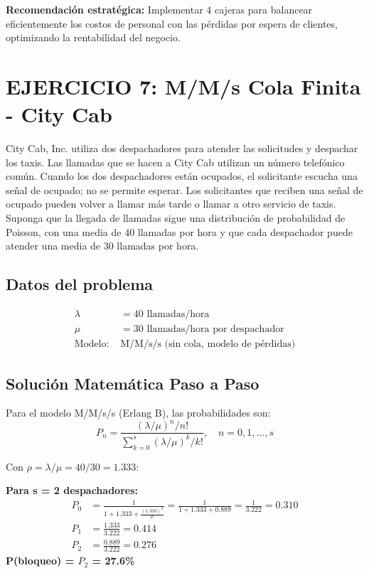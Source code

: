 \documentclass[12pt, a4paper, oneside]{book}
\theoremstyle{definition}
\begin{document}
\begin{center}
\begin{center}
\textbf{Recomendación estratégica:} Implementar 4 cajeras para balancear eficientemente los costos de personal con las pérdidas por espera de clientes, optimizando la rentabilidad del negocio.

\section{EJERCICIO 7: M/M/s Cola Finita - City Cab}

City Cab, Inc. utiliza dos despachadores para atender las solicitudes y despachar los taxis. Las llamadas que se hacen a City Cab utilizan un número telefónico común. Cuando los dos despachadores están ocupados, el solicitante escucha una señal de ocupado; no se permite esperar. Los solicitantes que reciben una señal de ocupado pueden volver a llamar más tarde o llamar a otro servicio de taxis. Suponga que la llegada de llamadas sigue una distribución de probabilidad de Poisson, con una media de 40 llamadas por hora y que cada despachador puede atender una media de 30 llamadas por hora.

\subsection{Datos del problema}
\begin{align*}
\lambda &= 40 \text{ llamadas/hora} \\
\mu &= 30 \text{ llamadas/hora por despachador} \\
\text{Modelo: } &\text{M/M/s/s (sin cola, modelo de pérdidas)}
\end{align*}

\subsection{Solución Matemática Paso a Paso}

Para el modelo M/M/s/s (Erlang B), las probabilidades son:
$$P_n = \frac{(\lambda/\mu)^n/n!}{\sum_{k=0}^{s} (\lambda/\mu)^k/k!}, \quad n = 0, 1, \ldots, s$$

Con $\rho = \lambda/\mu = 40/30 = 1.333$:

\textbf{Para s = 2 despachadores:}
\begin{align*}
P_0 &= \frac{1}{1 + 1.333 + \frac{(1.333)^2}{2!}} = \frac{1}{1 + 1.333 + 0.889} = \frac{1}{3.222} = 0.310 \\
P_1 &= \frac{1.333}{3.222} = 0.414 \\
P_2 &= \frac{0.889}{3.222} = 0.276
\end{align*}
\textbf{P(bloqueo) = $P_2$ = 27.6\%}


\end{center}
\end{center}
\end{document}
